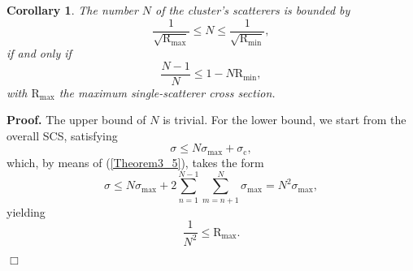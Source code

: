\documentclass{article}
\newtheorem{corollary}{Corollary}
\begin{document}
%
\begin{corollary}\label{corol4}
The number $N$ of the cluster's scatterers is bounded by
%
\begin{equation}\label{corollary3_01}
        \frac{1}{\sqrt{\mathrm{R}_{\mathrm{max}}}}\leq N\leq\frac{1}{\sqrt{\mathrm{R}_{\mathrm{min}}}},
    \end{equation}
%
if and only if
%
\begin{equation}\label{corol3_00}
    \frac{N-1}{N}\leq1-N\mathrm{R}_{\mathrm{min}},
\end{equation} 
%
%
with $\mathrm{R}_{\mathrm{max}}$ the maximum single-scatterer cross section.
%
\end{corollary}
\textbf{Proof.}
%
The upper bound of $N$ is trivial. For the lower bound, we start from the overall SCS, satisfying
%
\begin{equation}
\label{corollary3_1}
\sigma\leq N\sigma_{\mathrm{max}}+\sigma_\mathrm{c},
\end{equation}
%
which, by means of (\ref{Theorem3_5}), takes the form
%
\begin{equation}
\label{corollary3_2}
\sigma\leq N\sigma_{\mathrm{max}}+2\sum_{n=1}^{N-1}\sum_{m=n+1}^{N}\sigma_{\mathrm{max}}=N^2\sigma_{\mathrm{max}},
\end{equation}
%
%
yielding
%
\begin{equation}
\label{corollary3_4}
\frac{1}{N^2}\leq \mathrm{R}_{\mathrm{max}}.
\end{equation}
%
 \begin{flushright}$\Box$\end{flushright}
\end{document}
